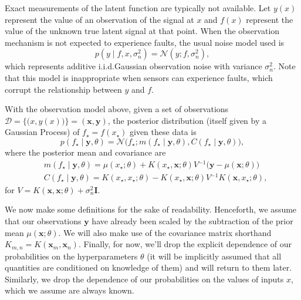 \documentclass[twoside]{article}
\newcommand{\deq}{=}
\newcommand{\given}{\!\ensuremath{\mid}\!}
\newcommand{\cm}[1]{\ensuremath{\mathcal{#1}}}
\newcommand{\bm}[1]{\ensuremath{\mathbf{#1}}}
\newcommand{\data}{\ensuremath{\cm{D}}}
\newcommand{\inv}{\ensuremath{^{-1}}}
\newcommand{\vect}[1]{\bm{#1}}
\newcommand{\vy}{\vect{y}}
\newcommand{\vx}{\vect{x}}
\newcommand{\mean}[2]{{m}(#1\given#2)}
\newcommand{\cov}[2]{{C}(#1\given#2)}
\newcommand{\st}{_{\star}}
\begin{document}
Exact measurements of the latent function are typically not available.
Let $y(x)$ represent the
value of an observation of the signal at $x$ and $f(x)$
represent the value of the unknown true latent signal at that point.
When the observation mechanism is not expected to experience faults,
the usual noise model used is
\begin{equation}\label{iidnoise}
 p(y \given f, x, \sigma_n^2)
 \deq
 \cm{N}(y; f, \sigma_n^2),
\end{equation}
which represents additive i.i.d.\space Gaussian observation noise with
variance $\sigma_n^2$. Note that this model is inappropriate when
sensors can experience faults, which corrupt the relationship
between $y$ and $f$.

With the observation model above, given a set of observations
$
 \data
 \deq
 \bigl\lbrace
   \bigl( x, y(x) \bigr)
 \bigr\rbrace
 \deq
 ( \bm{x}, \bm{y} )
$,
the posterior distribution (itself given by a Gaussian Process) of $f\st \deq f(x\st)$ given these data is
\begin{equation*}
 p(f\st \given \vy, \theta)
 =
 \cm{N}
 \bigl(
   f\st;
   \mean{f\st}{\vy,\theta},
   \cov{f\st}{\vy,\theta}
 \bigr),
\end{equation*}
where the posterior mean and covariance are
\begin{align*}
 &
 \mean{f\st}{\vy,\theta}
 \deq
 \mu(x\st; \theta)
 +
 K(x\st, \bm{x}; \theta)
V \inv
 \bigl(
   \bm{y} - \mu(\bm{x}; \theta)
 \bigr)
 \\  
 &
 \cov{f\st}{\vy,\theta}
 \deq
 K(x\st, x\st; \theta)
 -
 K(x\st, \bm{x}; \theta)
 V\inv
 K(\bm{x}, x\st; \theta),
\end{align*}
for $ V \deq 
 K(\bm{x}, \bm{x}; \theta) + \sigma_n^2 \bm{I}
 $.

We now make some definitions for the sake of readability. Henceforth,
we assume that our observations $\vy$ have already been scaled by the
subtraction of the prior mean $\mu(\bm{x}; \theta)$. We will also make
use of the covariance matrix shorthand $K_{m,n} \deq
K(\vx_m,\vx_n)$. Finally, for now, we'll drop the explicit dependence
of our probabilities on the hyperparameters $\theta$ (it will be
implicitly assumed that all quantities are conditioned on knowledge of
them) and will return to them later. Similarly, we drop the dependence of our probabilities on the values of inputs $x$, which we assume are always known.
\end{document}
